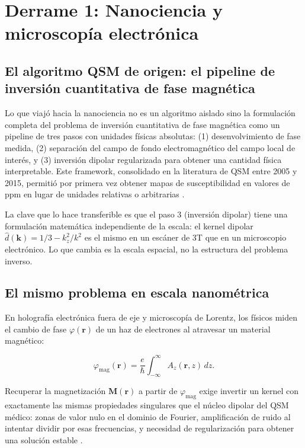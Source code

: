 \documentclass[12pt, a4paper]{article}
\begin{document}
\section{Derrame 1: Nanociencia y microscopía electrónica}

\subsection{El algoritmo QSM de origen: el pipeline de inversión cuantitativa de fase magnética}

Lo que viajó hacia la nanociencia no es un algoritmo aislado sino la formulación completa del problema de inversión cuantitativa de fase magnética como un pipeline de tres pasos con unidades físicas absolutas: (1) desenvolvimiento de fase medida, (2) separación del campo de fondo electromagnético del campo local de interés, y (3) inversión dipolar regularizada para obtener una cantidad física interpretable. Este framework, consolidado en la literatura de QSM entre 2005 y 2015, permitió por primera vez obtener mapas de susceptibilidad en valores de ppm en lugar de unidades relativas o arbitrarias \cite{Wang2015QSM, Liu2011MEDI}.

La clave que lo hace transferible es que el paso 3 (inversión dipolar) tiene una formulación matemática independiente de la escala: el kernel dipolar $\hat{d}(\mathbf{k}) = 1/3 - k_z^2/k^2$ es el mismo en un escáner de 3T que en un microscopio electrónico. Lo que cambia es la escala espacial, no la estructura del problema inverso.

\subsection{El mismo problema en escala nanométrica}

En holografía electrónica fuera de eje y microscopía de Lorentz, los físicos miden el cambio de fase $\varphi(\mathbf{r})$ de un haz de electrones al atravesar un material magnético:

\begin{equation}
  \varphi_{\text{mag}}(\mathbf{r}) = \frac{e}{\hbar}\int_{-\infty}^{\infty} A_z(\mathbf{r}, z)\,dz.
\end{equation}

Recuperar la magnetización $\mathbf{M}(\mathbf{r})$ a partir de $\varphi_{\text{mag}}$ exige invertir un kernel con exactamente las mismas propiedades singulares que el núcleo dipolar del QSM médico: zonas de valor nulo en el dominio de Fourier, amplificación de ruido al intentar dividir por esas frecuencias, y necesidad de regularización para obtener una solución estable \cite{Mansueto2024Holography}.
\end{document}
